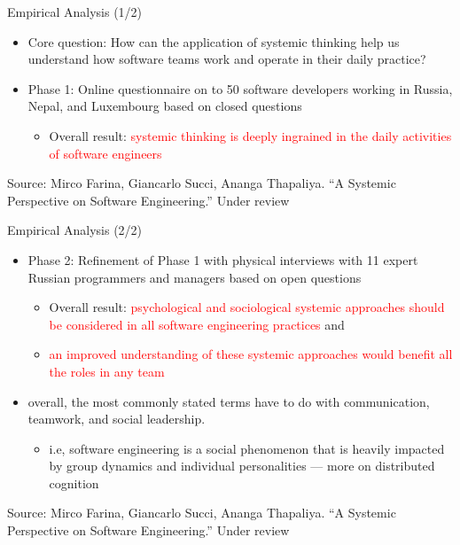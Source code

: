 \documentclass{beamer}
\begin{document}
\begin{frame}
{\centerline{Empirical Analysis (1/2)}}

\begin{itemize}
 \item Core question: How can the application of systemic thinking help us understand how software teams work and operate in their daily practice?
\item Phase 1: Online questionnaire on to 50 software developers working in Russia, Nepal, and Luxembourg based on closed questions
    \begin{itemize}
    \item Overall result: \textcolor{red}{systemic thinking is deeply ingrained in the daily activities of software engineers}
    \end{itemize}
\end{itemize}


\begin{center}
    \tiny{Source: Mirco Farina, Giancarlo Succi, Ananga Thapaliya. ``A Systemic Perspective on Software Engineering.'' Under review}
\end{center}

\end{frame}

\begin{frame}
{\centerline{Empirical Analysis (2/2)}}

\begin{itemize}
\item Phase 2: Refinement of Phase 1 with physical interviews with 11 expert Russian programmers and managers based on open questions
\begin{itemize}
    \item Overall result: \textcolor{red}{psychological and sociological systemic approaches should be considered in all software engineering practices} and 
    \item  \textcolor{red}{an improved understanding of these systemic approaches would benefit all the roles in any team}
    \end{itemize}
\item overall, the most commonly stated terms have to do with communication, teamwork, and social leadership. 
\begin{itemize}
\item i.e, software engineering is a social phenomenon that is heavily impacted by group dynamics and individual personalities --- more on distributed cognition
\end{itemize}
\end{itemize}


\begin{center}
    \tiny{Source: Mirco Farina, Giancarlo Succi, Ananga Thapaliya. ``A Systemic Perspective on Software Engineering.'' Under review}
\end{center}

\end{frame}
\end{document}
